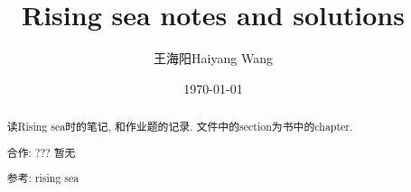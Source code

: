 \documentclass{article}
\begin{document}
\title{Rising sea notes and solutions}
\author{王海阳Haiyang Wang}
\date{\today}
\maketitle

\begin{abstract}
    读Rising sea时的笔记, 和作业题的记录. 文件中的section为书中的chapter.  
    
    合作: ??? 暂无

    参考:
    rising sea

\end{abstract}

\tableofcontents



% 
% 
% 
\end{document}
